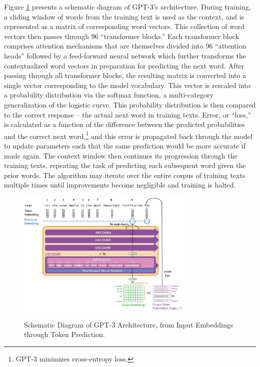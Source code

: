 \documentclass{article}
\begin{document}
Figure \ref{fig:schematic2} presents a schematic diagram of GPT-3's architecture. During
training, a sliding window of words from the training text is used as
the context, and is represented as a matrix of corresponding word
vectors. This collection of word vectors then passes through 96
``transformer blocks.'' Each transformer block comprises attention
mechanisms that are themselves divided into 96 ``attention heads''
followed by a feed-forward neural network which further transforms the
contextualized word vectors in preparation for predicting the next word.
After passing through all transformer blocks, the resulting matrix is
converted into a single vector corresponding to the model vocabulary.
This vector is rescaled into a probability distribution via the softmax
function, a multi-category generalization of the logistic curve. This
probability distribution is then compared to the correct response -- the
actual next word in training texts. Error, or ``loss,'' is calculated as
a function of the difference between the predicted probabilities and the
correct next word,\footnote{GPT-3 minimizes cross-entropy loss.} and
this error is propagated back through the model to update parameters
such that the same prediction would be more accurate if made again. The
context window then continues its progression through the training
texts, repeating the task of predicting each subsequent word given the
prior words. The algorithm may iterate over the entire corpus of
training texts multiple times until improvements become negligible and
training is halted.

\begin{figure}[!htbp]
  \captionsetup{justification=raggedright,singlelinecheck=false}
  \caption{Schematic Diagram of GPT-3 Architecture, from Input Embeddings through Token Prediction.}
  \centering
\includegraphics[width=0.75\textwidth]{./figures/media/image16.jpg}
\label{fig:schematic2}
\end{figure}
\end{document}
